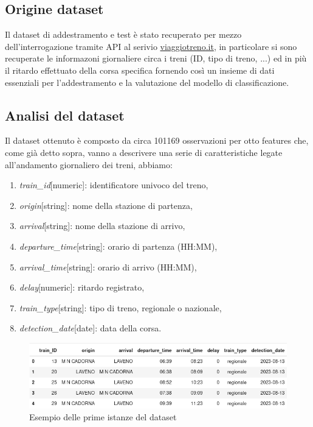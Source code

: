 \documentclass[italian,12pt,a4paper]{article}
\begin{document}
	\subsection{Origine dataset}
		Il dataset di addestramento e test è stato recuperato per mezzo dell'interrogazione tramite API al serivio 	\href{http://www.viaggiatreno.it/infomobilita/index.jsp}{viaggiotreno.it}, in particolare si sono recuperate le informazoni giornaliere circa i treni (ID, tipo di treno, ...) ed in più il ritardo effettuato della corsa specifica fornendo così un insieme di dati essenziali per l'addestramento e la valutazione del modello di classificazione.
		
	\subsection{Analisi del dataset}
		Il dataset ottenuto è composto da circa 101169 osservazioni per otto features che, come già detto sopra, vanno a descrivere una serie di caratteristiche legate all'andamento giornaliero dei treni, abbiamo:
		
		\begin{enumerate}
			\item \textit{train\_id}[numeric]: identificatore univoco del treno,
			\item \textit{origin}[string]: nome della stazione di partenza,
			\item \textit{arrival}[string]: nome della stazione di arrivo,
			\item \textit{departure\_time}[string]: orario di partenza (HH:MM),
			\item \textit{arrival\_time}[string]: orario di arrivo (HH:MM),
			\item \textit{delay}[numeric]: ritardo registrato,
			\item \textit{train\_type}[string]: tipo di treno, regionale o nazionale,
			\item \textit{detection\_date}[date]: data della corsa.
		\end{enumerate}
		
			\begin{figure}[!h]
				\centering
				\includegraphics[width=1.1\linewidth]{img/dataset}
				\caption{Esempio delle prime istanze del dataset}
			\end{figure}
	
\end{document}
